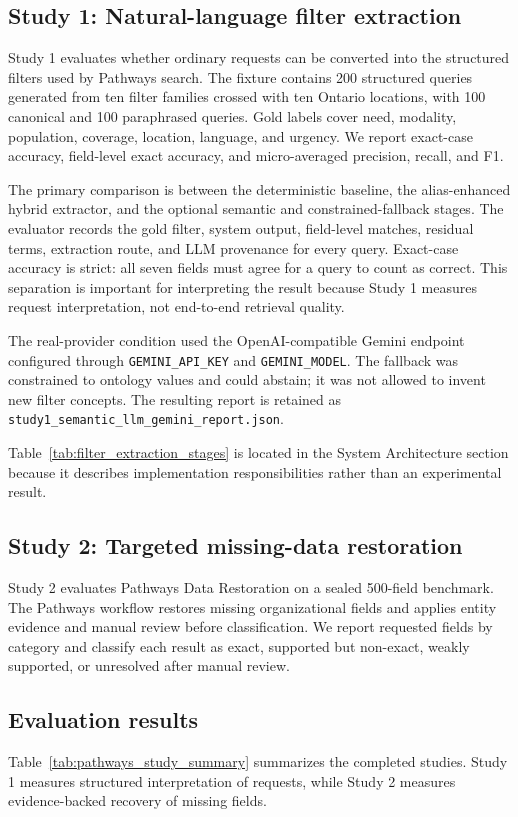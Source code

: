 \documentclass[12pt,oneside]{report}
\begin{document}
\subsection{Study 1: Natural-language filter extraction}
Study 1 evaluates whether ordinary requests can be converted into the structured filters used by Pathways search. The fixture contains 200 structured queries generated from ten filter families crossed with ten Ontario locations, with 100 canonical and 100 paraphrased queries. Gold labels cover need, modality, population, coverage, location, language, and urgency. We report exact-case accuracy, field-level exact accuracy, and micro-averaged precision, recall, and F1.

The primary comparison is between the deterministic baseline, the alias-enhanced hybrid extractor, and the optional semantic and constrained-fallback stages. The evaluator records the gold filter, system output, field-level matches, residual terms, extraction route, and LLM provenance for every query. Exact-case accuracy is strict: all seven fields must agree for a query to count as correct. This separation is important for interpreting the result because Study 1 measures request interpretation, not end-to-end retrieval quality.

The real-provider condition used the OpenAI-compatible Gemini endpoint configured through \texttt{GEMINI\_API\_KEY} and \texttt{GEMINI\_MODEL}. The fallback was constrained to ontology values and could abstain; it was not allowed to invent new filter concepts. The resulting report is retained as \texttt{study1\_semantic\_llm\_gemini\_report.json}.

Table~\ref{tab:filter_extraction_stages} is located in the System Architecture section because it describes implementation responsibilities rather than an experimental result.

\subsection{Study 2: Targeted missing-data restoration}
Study 2 evaluates Pathways Data Restoration on a sealed 500-field benchmark. The Pathways workflow restores missing organizational fields and applies entity evidence and manual review before classification. We report requested fields by category and classify each result as exact, supported but non-exact, weakly supported, or unresolved after manual review.

\subsection{Evaluation results}
Table~\ref{tab:pathways_study_summary} summarizes the completed studies. Study 1 measures structured interpretation of requests, while Study 2 measures evidence-backed recovery of missing fields.
\end{document}
